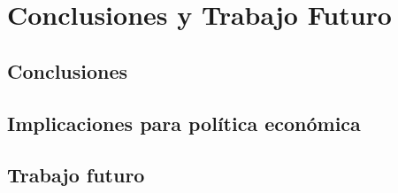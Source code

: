 \chapter{Conclusiones y Trabajo Futuro}

\section{Conclusiones}
%
%
%
%
%

\section{Implicaciones para política económica}

\section{Trabajo futuro}
%
%
%
%
%
